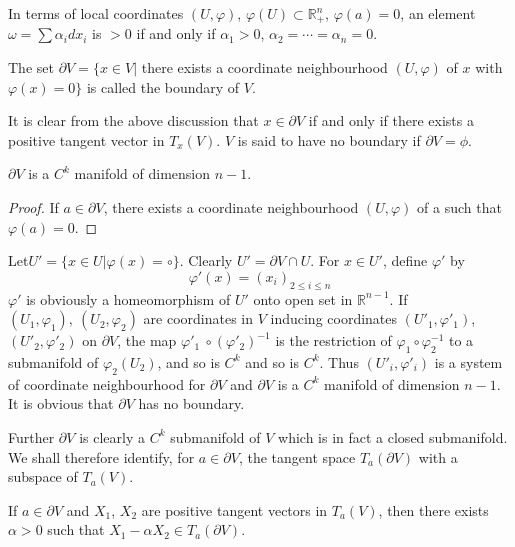 In terms of local coordinates $(U, \varphi )$, $\varphi (U) \subset
\mathbb{R}^n_+$, $\varphi (a) = 0$, an element $\omega = \sum \alpha_i
dx_i $ is  $ > 0$ if and only if $\alpha_1 >  0$, $\alpha_2 =  \cdots
= \alpha_n = 0$. 

\begin{defi*}
  The set $\partial V = \big\{ x \in V  \Big|$ there exists a
  coordinate neighbourhood $(U, \varphi)$ of $x$ with $\varphi (x) = 0
  \big \}$ is called the boundary of $V$. 
\end{defi*}

\begin{remark*}
  It is clear from the above discussion that $x \in \partial V$ if and
  only if there exists a positive tangent vector in $T_x (V)$. $V$ is
  said to have no boundary if $\partial V = \phi$. 
\end{remark*}

\begin{proposition}\label{chap2:sec5:prop4} %
  $\partial V$ is a $C^k$ manifold of dimension $n-1$.
\end{proposition}

\begin{proof}
  If $a \in \partial V$, there exists a coordinate neighbourhood $(U,
  \varphi )$ of a such that $\varphi (a) = 0$. 
\end{proof}

Let\pageoriginale $U' = \Big\{ x \in U \Big|  \varphi (x) = \circ \Big\}$. Clearly $U' =
\partial V \cap U$. For $x \in U'$, define $\varphi'$ by 
$$
\varphi' (x) = (x_i)_{2 \leq i \leq n}
$$
$\varphi'$ is obviously a homeomorphism of $U'$ onto open set in
$\mathbb{R}^{n-1}$. If $(U_1, \varphi_1), ~ (U_2, \varphi_2)$ are
coordinates in $V$ inducing coordinates $(U'_1, \varphi'_1)$, $(U'_2,
\varphi'_2)$ on $\partial V$, the map $\varphi'_1 ~\circ
(\varphi'_2)^{-1}$ is the restriction of  $\varphi_1 \circ \varphi^{-1}_2$
to a submanifold of $\varphi_2 (U_2)$, and so is  $C^k$ and so is
$C^k$. Thus  $(U'_i, \varphi'_i)$ is a  system of coordinate
neighbourhood for  $\partial V$ and $\partial V$ is a $C^k$ manifold
of  dimension $n-1$. It is obvious that $\partial V$ has no boundary. 

Further $\partial V$ is clearly a $C^k$ submanifold of $V$ which is in
fact a closed submanifold. We shall therefore identify, for $a \in
\partial V$, the tangent space $T_a (\partial V)$ with a subspace of
$T_a (V)$.  

\begin{proposition}\label{chap2:sec5:prop5}%
  If $a \in \partial V$ and $X_1$, $X_2$ are positive tangent vectors
  in $T_a (V)$, then there exists $\alpha > 0$ such that  $X_1 -
  \alpha X_2 \in T_a (\partial V )$.  
\end{proposition}


